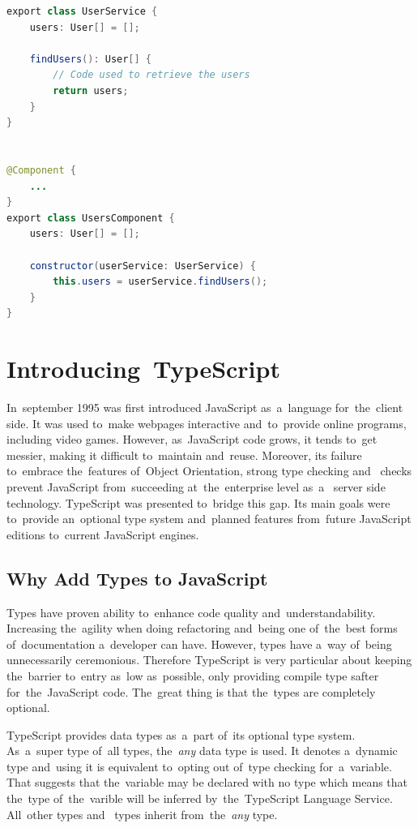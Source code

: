 \begin{lstlisting}[caption=An~example of~dependency injection in~Angular.,
label=lst-angular-service, style=dp-default, language=Java]
export class UserService {
	users: User[] = [];
	
	findUsers(): User[] {
		// Code used to retrieve the users
		return users;
	}
}


@Component {
	...
}
export class UsersComponent {
	users: User[] = [];
	
	constructor(userService: UserService) {
		this.users = userService.findUsers();
	}
}
\end{lstlisting}


\section{Introducing~TypeScript}
\label{TypeScript}
In~september 1995 was first introduced JavaScript as~a~language for~the~client
side. It was used to~make webpages interactive and~to~provide online programs,
including video games. However, as~JavaScript code grows, it tends to~get
messier, making it difficult to~maintain and~reuse. Moreover, its failure
to~embrace the~features of~Object Orientation, strong type checking
and~ checks prevent JavaScript from~succeeding
at~the~enterprise level as~a~ server side technology.
TypeScript was presented to~bridge this gap. Its main goals were to~provide
an~optional type system and~planned features from~future JavaScript editions
to~current JavaScript engines.


\subsection{Why Add Types to JavaScript}
Types have proven ability to~enhance code quality and~understandability.
Increasing the~agility when doing refactoring and~being one of~the~best forms
of~documentation a~developer can have. However, types have a~way of~being
unnecessarily ceremonious. Therefore TypeScript is very particular about keeping
the~barrier to~entry as~low as~possible, only providing compile type safter
for~the~JavaScript code. The~great thing is that the~types are completely
optional.

TypeScript provides data types as~a~part of~its optional type system. As~a~super
type of~all types, the~\textit{any} data type is used. It denotes a~dynamic type
and~using it is equivalent to~opting out of~type checking for~a~variable. That
suggests that the~variable may be declared with no type which means that
the~type of~the~varible will be inferred by~the~TypeScript Language Service.
All~other  types and~ types inherit
from~the~\textit{any} type.

